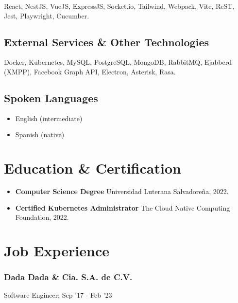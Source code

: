 \documentclass[letterpaper]{article}
\begin{document}
React, NestJS, VueJS, ExpressJS, Socket.io, Tailwind, Webpack, Vite, ReST, Jest, Playwright, Cucumber.

\subsection{External Services \& Other Technologies}

Docker, Kubernetes, MySQL, PostgreSQL, MongoDB, RabbitMQ, Ejabberd (XMPP), Facebook Graph API, Electron, Asterisk, Rasa.

\subsection{Spoken Languages}

\begin{itemize}
	\item English (intermediate)
	\item Spanish (native)
\end{itemize}

\section{Education \& Certification}

\begin{itemize}
	\item \textbf{Computer Science Degree} \newline Universidad Luterana Salvadoreña, 2022.

	\item \textbf{Certified Kubernetes Administrator} \newline The Cloud Native Computing Foundation, 2022.
\end{itemize}

\section{Job Experience}

\subsubsection{Dada Dada \& Cia. S.A. de C.V.}

Software Engineer; Sep '17 - Feb '23
\end{document}
